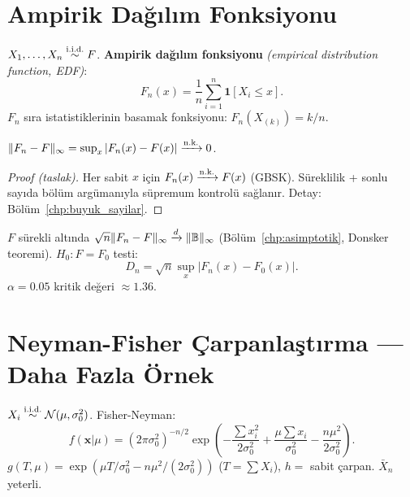 \section{Ampirik Dağılım Fonksiyonu}
\label{sec:ampirik_dagilim}

\begin{tanim}\label{def:edf}
$X_1,\ldots,X_n\overset{\text{i.i.d.}}{\sim} F$. \textbf{Ampirik dağılım fonksiyonu} \emph{(empirical distribution function, EDF)}:
\[
  F_n(x) = \frac{1}{n}\sum_{i=1}^n\mathbf{1}[X_i\leq x].
\]
$F_n$ sıra istatistiklerinin basamak fonksiyonu: $F_n(X_{(k)}) = k/n$.
\end{tanim}

\begin{teorem}\label{thm:glivenko_cantelli}
$\|F_n - F\|_\infty = \sup_x|F_n(x)-F(x)|\xrightarrow{\text{n.k.}}0$.
\end{teorem}

\begin{proof}[Proof (taslak)]
Her sabit $x$ için $F_n(x)\xrightarrow{\text{n.k.}} F(x)$ (GBSK). Süreklilik + sonlu sayıda bölüm argümanıyla süpremum kontrolü sağlanır. Detay: Bölüm~\ref{chp:buyuk_sayilar}.
\end{proof}

\begin{teorem}\label{thm:ks_istatistik}
$F$ sürekli altında $\sqrt{n}\|F_n-F\|_\infty\xrightarrow{d}\|\mathbb{B}\|_\infty$ (Bölüm~\ref{chp:asimptotik}, Donsker teoremi). $H_0:F=F_0$ testi:
\[
  D_n = \sqrt{n}\sup_x|F_n(x)-F_0(x)|.
\]
$\alpha=0.05$ kritik değeri $\approx1.36$.
\end{teorem}

\section{Neyman-Fisher Çarpanlaştırma --- Daha Fazla Örnek}
\label{sec:carpanlastirma_ornekler}

\begin{ornek}\label{ex:normal_mu_yeterli}
$X_i\overset{\text{i.i.d.}}{\sim}\mathcal{N}(\mu,\sigma_0^2)$. Fisher-Neyman:
\[
  f(\mathbf{x}|\mu) = (2\pi\sigma_0^2)^{-n/2}\exp\!\left(-\frac{\sum x_i^2}{2\sigma_0^2}+\frac{\mu\sum x_i}{\sigma_0^2}-\frac{n\mu^2}{2\sigma_0^2}\right).
\]
$g(T,\mu)=\exp(\mu T/\sigma_0^2-n\mu^2/(2\sigma_0^2))$ ($T=\sum X_i$), $h=$ sabit çarpan. $\bar{X}_n$ yeterli.
\end{ornek}

